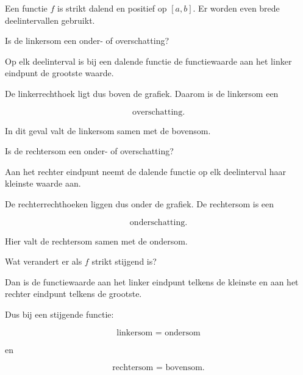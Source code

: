 \documentclass{ximera}
\begin{document}




\begin{oefening}{\oefU\ESS}

Een functie \(f\) is strikt dalend en positief op \([a,b]\). Er worden
even brede deelintervallen gebruikt.

\begin{question}
Is de linkersom een onder- of overschatting?

\begin{oplossing}
Op elk deelinterval is bij een dalende functie de functiewaarde aan het
linker eindpunt de grootste waarde.

De linkerrechthoek ligt dus boven de grafiek. Daarom is de linkersom een

\[
\boxed{\text{overschatting}}.
\]

In dit geval valt de linkersom samen met de bovensom.
\end{oplossing}
\end{question}

\begin{question}
Is de rechtersom een onder- of overschatting?

\begin{oplossing}
Aan het rechter eindpunt neemt de dalende functie op elk deelinterval
haar kleinste waarde aan.

De rechterrechthoeken liggen dus onder de grafiek. De rechtersom is een

\[
\boxed{\text{onderschatting}}.
\]

Hier valt de rechtersom samen met de ondersom.
\end{oplossing}
\end{question}

\begin{question}
Wat verandert er als \(f\) strikt stijgend is?

\begin{oplossing}
Dan is de functiewaarde aan het linker eindpunt telkens de kleinste en
aan het rechter eindpunt telkens de grootste.

Dus bij een stijgende functie:

\[
\boxed{\text{linkersom = ondersom}}
\]

en

\[
\boxed{\text{rechtersom = bovensom}}.
\]
\end{oplossing}
\end{question}

\end{oefening}
\end{document}
